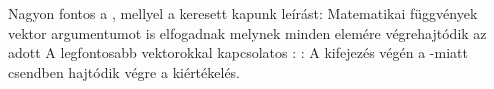 Nagyon fontos a  \fv{}, mellyel a keresett  kapunk leírást:
Matematikai függvények  vektor argumentumot is elfogadnak melynek minden elemére
végrehajtódik az adott \fv{:}
\Dnew
A legfontosabb vektorokkal kapcsolatos :\newline
{}:
A kifejezés végén a \mcode{;}-miatt csendben hajtódik végre a kiértékelés.